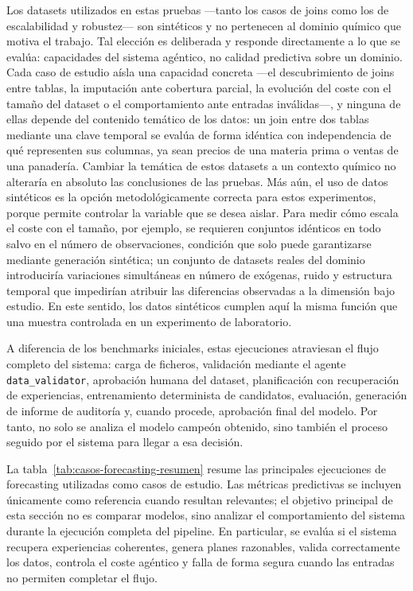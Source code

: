 \documentclass[12pt,a4paper]{article}
\theoremstyle{plain}
\begin{document}
Los datasets utilizados en estas pruebas ---tanto los casos de joins como los de escalabilidad y robustez--- son sintéticos y no pertenecen al dominio químico que motiva el trabajo. Tal elección es deliberada y responde directamente a lo que se evalúa: capacidades del sistema agéntico, no calidad predictiva sobre un dominio. Cada caso de estudio aísla una capacidad concreta ---el descubrimiento de joins entre tablas, la imputación ante cobertura parcial, la evolución del coste con el tamaño del dataset o el comportamiento ante entradas inválidas---, y ninguna de ellas depende del contenido temático de los datos: un join entre dos tablas mediante una clave temporal se evalúa de forma idéntica con independencia de qué representen sus columnas, ya sean precios de una materia prima o ventas de una panadería. Cambiar la temática de estos datasets a un contexto químico no alteraría en absoluto las conclusiones de las pruebas. Más aún, el uso de datos sintéticos es la opción metodológicamente correcta para estos experimentos, porque permite controlar la variable que se desea aislar. Para medir cómo escala el coste con el tamaño, por ejemplo, se requieren conjuntos idénticos en todo salvo en el número de observaciones, condición que solo puede garantizarse mediante generación sintética; un conjunto de datasets reales del dominio introduciría variaciones simultáneas en número de exógenas, ruido y estructura temporal que impedirían atribuir las diferencias observadas a la dimensión bajo estudio. En este sentido, los datos sintéticos cumplen aquí la misma función que una muestra controlada en un experimento de laboratorio.

A diferencia de los benchmarks iniciales, estas ejecuciones atraviesan el flujo completo del sistema: carga de ficheros, validación mediante el agente \texttt{data\_validator}, aprobación humana del dataset, planificación con recuperación de experiencias, entrenamiento determinista de candidatos, evaluación, generación de informe de auditoría y, cuando procede, aprobación final del modelo. Por tanto, no solo se analiza el modelo campeón obtenido, sino también el proceso seguido por el sistema para llegar a esa decisión.

La tabla~\ref{tab:casos-forecasting-resumen} resume las principales ejecuciones de forecasting utilizadas como casos de estudio. Las métricas predictivas se incluyen únicamente como referencia cuando resultan relevantes; el objetivo principal de esta sección no es comparar modelos, sino analizar el comportamiento del sistema durante la ejecución completa del pipeline. En particular, se evalúa si el sistema recupera experiencias coherentes, genera planes razonables, valida correctamente los datos, controla el coste agéntico y falla de forma segura cuando las entradas no permiten completar el flujo.
\end{document}
